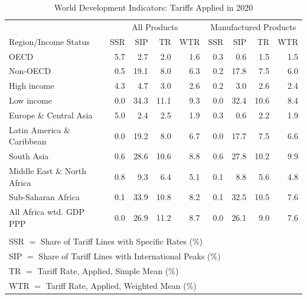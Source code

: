 \documentclass[a4paper]{article}
\begin{document}
\begin{table}[h!] \vspace{-2mm}
\centering
\caption{\label{tab:TARIFFs} World Development Indicators: Tariffs Applied in 2020}
\vspace{2mm}
\begin{tabular}{lrrrrrrrr}
  \toprule
& \multicolumn{4}{c}{All Products} & \multicolumn{4}{c}{Manufactured Products} \\
Region/Income Status & SSR & SIP & TR & WTR &  SSR & SIP & TR & WTR \\
  \midrule
  OECD & 5.7 & 2.7 & 2.0 & 1.6 & 0.3 & 0.6 & 1.5 & 1.5 \\ 
  Non-OECD & 0.5 & 19.1 & 8.0 & 6.3 & 0.2 & 17.8 & 7.5 & 6.0 \\ \midrule
  High income & 4.3 & 4.7 & 3.0 & 2.6 & 0.2 & 3.0 & 2.6 & 2.4 \\ 
  Low income & 0.0 & 34.3 & 11.1 & 9.3 & 0.0 & 32.4 & 10.6 & 8.4 \\ \midrule
Europe \& Central Asia & 5.0 & 2.4 & 2.5 & 1.9 & 0.3 & 0.6 & 2.2 & 1.9 \\ 
  Latin America \& Caribbean & 0.0 & 19.2 & 8.0 & 6.7 & 0.0 & 17.7 & 7.5 & 6.6 \\ 
  South Asia & 0.6 & 28.6 & 10.6 & 8.8 & 0.6 & 27.8 & 10.2 & 9.9 \\ 
  Middle East \& North Africa & 0.8 & 9.3 & 6.4 & 5.1 & 0.1 & 8.8 & 5.6 & 4.8 \\ 
  Sub-Saharan Africa & 0.1 & 33.9 & 10.8 & 8.2 & 0.1 & 32.5 & 10.5 & 7.6 \\ \midrule
  All Africa wtd. GDP PPP & 0.0 & 26.9 & 11.2 & 8.7 & 0.0 & 26.1 & 9.0 & 7.6 \\ 
\bottomrule \\ [-0.9em]
      \multicolumn{8}{l}{SSR $=$ Share of Tariff Lines with Specific Rates (\%)} \\
   \multicolumn{8}{l}{SIP $=$ Share of Tariff Lines with International Peaks (\%)} \\
   \multicolumn{8}{l}{TR $=$ Tariff Rate, Applied, Simple Mean (\%)} \\
   \multicolumn{8}{l}{WTR $=$ Tariff Rate, Applied, Weighted Mean (\%)} 
\end{tabular}
\vspace{-2mm}
\end{table}
\end{document}
